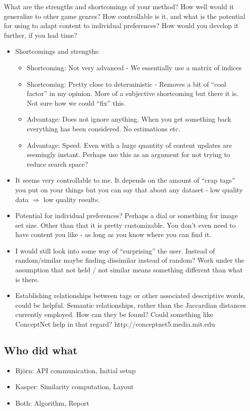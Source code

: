 \documentclass[]{article}
\begin{document}
\begin{framed}
What are the strengths and shortcomings of your method? How well would it generalize to other game genres? How controllable is it, and what is the potential for using to adapt content to individual preferences? How would you develop it further, if you had time?
\end{framed}
\begin{itemize}
\item Shortcomings and strengths:
	\begin{itemize}
	\item Shortcoming: Not very advanced - We essentially use a matrix of indices
	\item Shortcoming: Pretty close to deterministic - Removes a bit of ``cool factor'' in my opinion. More of a subjective shortcoming but there it is. Not sure how we could ``fix'' this.
	\item Advantage: Does not ignore anything. When you get something back everything has been considered. No estimations etc.
	\item Advantage: Speed. Even with a large quantity of content updates are seemingly instant. Perhaps use this as an argument for not trying to reduce search space?
	\end{itemize}
\item  It seems very controllable to me. It depends on the amount of ``crap tags'' you put on your things but you can say that about any dataset - low quality data $\Rightarrow$ low quality results. 
\item Potential for individual preferences? Perhaps a dial or something for image set size. Other than that it is pretty customizable. You don't even need to have content you like - as long as you know where you can find it.
\item I would still look into some way of ``surprising'' the user. Instead of random/similar maybe finding dissimilar instead of random? Work under the assumption that not held / not similar means something different than what is there.

\item Establishing relationships between tags or other associated descriptive words, could be helpful. Semantic relationships, rather than the Jaccardian distances currently employed.  How can they be found?  Could something like ConceptNet help in that regard?  http://conceptnet5.media.mit.edu  

\end{itemize}
\subsection{Who did what}
\begin{itemize}
\item Björn: API communication, Initial setup
\item Kasper: Similarity computation, Layout 
\item Both: Algorithm, Report
\end{itemize}



\end{document}
